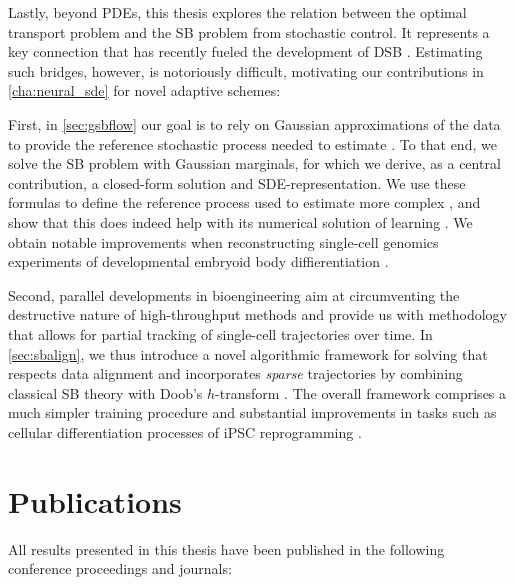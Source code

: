 Lastly, beyond PDEs, this thesis explores the relation between the optimal transport problem and the \acrfull{SB} problem from stochastic control. It represents a key connection that has recently fueled the development of \acrfull{DSB} \citep{de2021diffusion, chen2021stochastic, liu2022deep, bunne2022recovering}. Estimating such bridges, however, is notoriously difficult, motivating our contributions in \cref{cha:neural_sde} for novel adaptive schemes:

First, in \cref{sec:gsbflow} our goal is to rely on Gaussian approximations of the data to provide the reference stochastic process needed to estimate . To that end, we solve the \acrlong{SB} problem with Gaussian marginals, for which we derive, as a central contribution, a closed-form solution and SDE-representation. We use these formulas to define the reference process used to estimate more complex , and show that this does indeed help with its numerical solution of learning . We obtain notable improvements when reconstructing single-cell genomics experiments of developmental embryoid body diffierentiation \citep{bunne2022recovering}.

Second, parallel developments in bioengineering aim at circumventing the destructive nature of high-throughput methods and provide us with methodology that allows for partial tracking of single-cell trajectories over time.
In \cref{sec:sbalign}, we thus introduce a novel algorithmic framework for solving  that respects data alignment and incorporates \emph{sparse} trajectories by combining classical \acrlong{SB} theory with Doob's 
$h$-transform \citep{somnath2023aligned}. The overall framework comprises a much simpler training procedure and substantial improvements in tasks such as cellular differentiation processes of \acrshort{iPSC} reprogramming \citep{schiebinger2019optimal}.



\newpage
\section{Publications}
All results presented in this thesis have been published in the following conference proceedings and journals:

